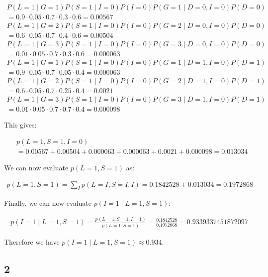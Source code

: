 \documentclass[a4paper, 12pt]{article}
\begin{document}
\begin{align}
	P(L=1 \mid G=1)P(S=1 \mid I=0)P(I=0)P(G=1 \mid D=0,I=0)P(D=0)&\\
	= 0.9 \cdot 0.05 \cdot 0.7 \cdot 0.3 \cdot 0.6 = 0.00567&\\
	P(L=1 \mid G=2)P(S=1 \mid I=0)P(I=0)P(G=2 \mid D=0,I=0)P(D=0)&\\
	= 0.6 \cdot 0.05 \cdot 0.7 \cdot 0.4 \cdot 0.6 = 0.00504&\\
	P(L=1 \mid G=3)P(S=1 \mid I=0)P(I=0)P(G=3 \mid D=0,I=0)P(D=0)&\\
	= 0.01 \cdot 0.05 \cdot 0.7 \cdot 0.3 \cdot 0.6 = 0.000063&\\
	P(L=1 \mid G=1)P(S=1 \mid I=0)P(I=0)P(G=1 \mid D=1,I=0)P(D=1)&\\
	= 0.9 \cdot 0.05 \cdot 0.7 \cdot 0.05 \cdot 0.4 = 0.000063&\\
	P(L=1 \mid G=2)P(S=1 \mid I=0)P(I=0)P(G=2 \mid D=1,I=0)P(D=1)&\\
	= 0.6 \cdot 0.05 \cdot 0.7 \cdot 0.25 \cdot 0.4 = 0.0021&\\
	P(L=1 \mid G=3)P(S=1 \mid I=0)P(I=0)P(G=3 \mid D=1,I=0)P(D=1)&\\
	= 0.01 \cdot 0.05 \cdot 0.7 \cdot 0.7 \cdot 0.4 = 0.000098&
\end{align}

This gives:

\begin{align}
	&p(L=1, S=1, I=0)\\
	&= 0.00567 + 0.00504 + 0.000063 +0.000063 + 0.0021 + 0.000098 = 0.013034
\end{align}

We can now evaluate $p(L=1, S=1)$ as:

\begin{align}
	p(L=1, S=1) = \sum_I p(L=I, S=I, I) = 0.1842528 + 0.013034 = 0.1972868
\end{align}

Finally, we can now evaluate $p(I=1 \mid L=1, S = 1)$:

\begin{align}
	p(I=1 \mid L=1, S = 1) = \frac{p(L=1, S=1, I=1)}{p(L=1, S=1)} = \frac{0.1842528}{0.1972868} = 0.9339337451872097
\end{align}

Therefore we have $p(I=1 \mid L=1, S = 1) \approx 0.934$.


\subsection{2}
\end{document}
